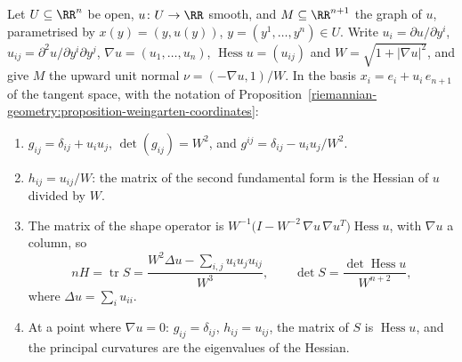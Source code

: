 \begin{proposition}\label{riemannian-geometry:proposition-graph-second-fundamental-form}
Let $U \subseteq \RR^n$ be open, $u \colon U \to \RR$ smooth, and $M \subseteq \RR^{n+1}$ the graph of $u$, parametrised by $x(y) = (y, u(y))$, $y = (y^1, \ldots, y^n) \in U$. Write
$u_i = \partial u/\partial y^i$, $u_{ij} = \partial^2u/\partial y^i\partial y^j$, $\nabla u = (u_1, \ldots, u_n)$, $\operatorname{Hess}u = (u_{ij})$ and $W = \sqrt{1 + |\nabla u|^2}$, and give $M$ the upward unit
normal $\nu = (-\nabla u, 1)/W$. In the basis $x_i = e_i + u_i\,e_{n+1}$ of the tangent space, with the notation of Proposition~\ref{riemannian-geometry:proposition-weingarten-coordinates}:
\begin{enumerate}
\item $g_{ij} = \delta_{ij} + u_iu_j$, $\det(g_{ij}) = W^2$, and $g^{ij} = \delta_{ij} - u_iu_j/W^2$.
\item $h_{ij} = u_{ij}/W$: the matrix of the second fundamental form is the Hessian of $u$ divided by $W$.
\item The matrix of the shape operator is $W^{-1}\bigl(I - W^{-2}\,\nabla u\,\nabla u^T\bigr)\operatorname{Hess}u$, with $\nabla u$ a column, so
\[
nH = \operatorname{tr}S = \frac{W^2\Delta u - \sum_{i,j}u_iu_ju_{ij}}{W^3}, \qquad \det S = \frac{\det\operatorname{Hess}u}{W^{n+2}} ,
\]
where $\Delta u = \sum_iu_{ii}$.
\item At a point where $\nabla u = 0$: $g_{ij} = \delta_{ij}$, $h_{ij} = u_{ij}$, the matrix of $S$ is $\operatorname{Hess}u$, and the principal curvatures are the eigenvalues of the Hessian.
\end{enumerate}
\end{proposition}

